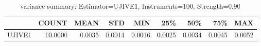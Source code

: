 \begin{table}[ht]
\centering
\caption{variance summary: Estimator=UJIVE1, Instruments=100, Strength=0.90}
\begin{tabular}{lrrrrrrrr}
\toprule
 & COUNT & MEAN & STD & MIN & 25\% & 50\% & 75\% & MAX \\
\midrule
UJIVE1 & 10.0000 & 0.0035 & 0.0014 & 0.0016 & 0.0025 & 0.0034 & 0.0045 & 0.0052 \\
\bottomrule
\end{tabular}
\end{table}
